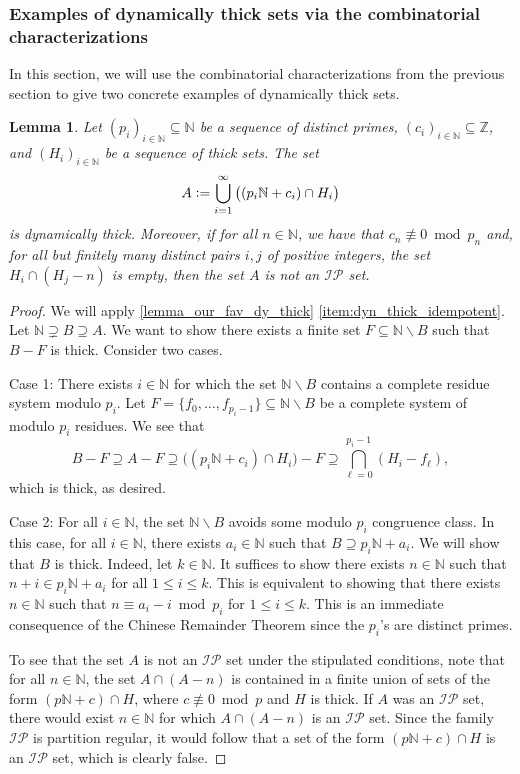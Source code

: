 \documentclass[letter,11pt]{article}
\theoremstyle{plain}
\newtheorem{lemma}[theorem]{Lemma}
\theoremstyle{definition}
\theoremstyle{plain}
\theoremstyle{plain}
\numberwithin{equation}{section}
\newcommand{\N}{\mathbb{N}}
\newcommand{\Z}{\mathbb{Z}}
\newcommand{\defeq}{\vcentcolon=}
\renewcommand{\leq}{\leqslant}
\renewcommand{\setminus}{\backslash}
\newcommand{\IP}{\mathcal{IP}}
\begin{document}
\subsubsection{Examples of dynamically thick sets via the combinatorial characterizations}
\label{sec_examples_using_combinatorics}
 

In this section, we will use the combinatorial characterizations from the previous section to give two concrete examples of dynamically thick sets.


\begin{lemma}
\label{rem:combinatorial_primes}
    Let $(p_i)_{i \in \N} \subseteq \N$ be a sequence of distinct primes, $(c_i)_{i \in \N} \subseteq \Z$, and $(H_i)_{i \in \N}$ be a sequence of thick sets. The set
    \[
        A \defeq \bigcup_{i=1}^\infty \big ((p_i \N  + c_i) \cap H_i \big)
    \]
    is dynamically thick.  Moreover, if for all $n \in \N$, we have that $c_n \not\equiv 0 \bmod {p_n}$ and, for all but finitely many distinct pairs $i, j$ of positive integers, the set $H_i \cap (H_j - n)$ is empty, then the set $A$ is not an $\IP$ set.
\end{lemma}

\begin{proof}
    We will apply \cref{lemma_our_fav_dy_thick} \eqref{item:dyn_thick_idempotent}.  Let $\N \supsetneq B \supseteq A$. We want to show there exists a finite set $F \subseteq \N \setminus B$ such that $B - F$ is thick. Consider two cases.

    Case 1: There exists $i \in \N$ for which the set $\N \setminus B$ contains a complete residue system modulo $p_i$. Let $F = \{f_0, \ldots, f_{p_i - 1}\} \subseteq \N \setminus B$ be a complete system of modulo $p_i$ residues. We see that
    \[B - F \supseteq A - F \supseteq \big((p_i \N + c_i) \cap H_i \big) - F \supseteq \bigcap_{\ell = 0}^{p_i - 1} (H_i - f_{\ell}),\]
    which is thick, as desired. 
    
    Case 2: For all $i \in \N$, the set $\N \setminus B$ avoids some modulo $p_i$ congruence class. In this case, for all $i \in \N$, there exists $a_i \in \N$ such that $B \supseteq p_i \N + a_i$. We will show that $B$ is thick. Indeed, let $k \in \N$. It suffices to show there exists $n \in \N$ such that $n + i \in p_i \N + a_i$ for all $1 \leq i \leq k$. This is equivalent to showing that there exists $n \in \N$ such that $n \equiv a_i - i \bmod p_i$ for $1 \leq i \leq k$. This is an immediate consequence of the Chinese Remainder Theorem since the $p_i$'s are distinct primes.

    To see that the set $A$ is not an $\IP$ set under the stipulated conditions, note that for all $n \in \N$, the set $A \cap (A-n)$ is contained in a finite union of sets of the form $(p \N + c ) \cap H$, where $c \not \equiv 0 \bmod p$ and $H$ is thick.  If $A$ was an $\IP$ set, there would exist $n \in \N$ for which $A \cap (A-n)$ is an $\IP$ set.  Since the family $\IP$ is partition regular, it would follow that a set of the form $(p \N + c ) \cap H$ is an $\IP$ set, which is clearly false.
\end{proof}
\end{document}
